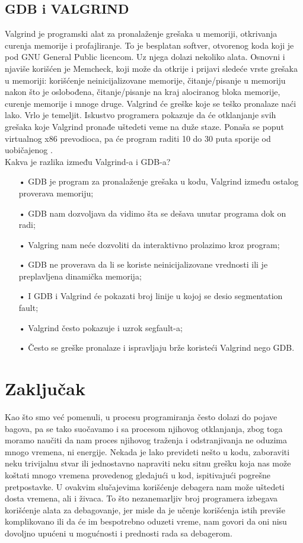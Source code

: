 \documentclass[a4paper]{article}
\begin{document}
\subsection{GDB i VALGRIND}
\label{subsec:valgrind}
Valgrind je programski alat za pronalaženje grešaka u memoriji, otkrivanja curenja memorije i 
profajliranje. To je besplatan softver, otvorenog koda koji je pod GNU General Public licencom. 
Uz njega dolazi nekoliko alata. Osnovni i njaviše korišćen je Memcheck, koji može da otkrije i  
prijavi sledeće vrste grešaka u memoriji: korišćenje neinicijalizovane memorije, čitanje/pisanje u 
memoriju nakon što je oslobođena, čitanje/pisanje na kraj alociranog bloka memorije, 
curenje memorije i  mnoge druge. Valgrind će greške koje se teško pronalaze naći lako. Vrlo je 
temeljit. Iskustvo programera pokazuje da će otklanjanje svih grešaka koje Valgrind pronađe 
uštedeti veme na duže staze. Ponaša se poput virtualnog x86 prevodioca, pa će program raditi 10 
do 30 puta sporije od uobičajenog \cite{hpc}.\\

Kakva je razlika između Valgrind-a i GDB-a?
\begin{enumerate}
\item[•]GDB je program za pronalaženje grešaka u kodu, Valgrind između ostalog proverava memoriju;
\item[•]GDB nam dozvoljava da vidimo šta se dešava unutar programa dok on radi;
\item[•]Valgring nam neće dozvoliti da interaktivno prolazimo kroz program;
\item[•]GDB ne proverava da li se koriste neinicijalizovane vrednosti ili je preplavljena dinamička memorija;
\item[•]I GDB i Valgrind će pokazati broj linije u kojoj se desio segmentation fault;
\item[•]Valgrind često pokazuje i uzrok segfault-a;
\item[•]Često se greške pronalaze i ispravljaju brže koristeći Valgrind nego GDB. \cite{hpc}
\end{enumerate}

\section{Zaključak}
\label{sec:zakljucak}

Kao što smo već pomenuli, u procesu programiranja često dolazi do pojave bagova, pa se tako suočavamo i sa procesom njihovog otklanjanja, zbog toga moramo naučiti da nam proces njihovog traženja i odstranjivanja ne oduzima mnogo vremena, ni energije. Nekada je lako prevideti nešto u kodu, zaboraviti neku trivijalnu stvar ili jednostavno napraviti neku sitnu grešku koja nas može koštati mnogo vremena provedenog gledajući u kod, ispitivajući pogrešne pretpostavke. U ovakvim slučajevima korišćenje debagera nam može uštedeti dosta vremena, ali i živaca. To što nezanemarljiv broj programera izbegava korišćenje alata za debagovanje, jer misle da je učenje korišćenja istih previše komplikovano ili da će im bespotrebno oduzeti vreme, nam govori da oni nisu dovoljno upućeni u mogućnosti i prednosti rada sa debagerom.
\end{document}
